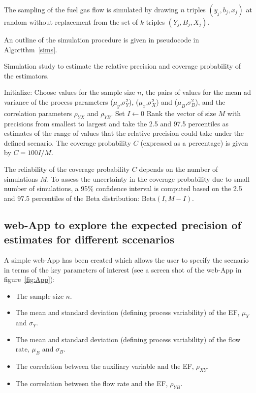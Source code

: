 The sampling of the fuel gas flow is simulated by drawing $n$ triples $(y_j,b_j,x_j)$ at random without replacement from the set of $k$ triples $(Y_j,B_j,X_j)$.

An outline of the simulation procedure is given in pseudocode in Algorithm~\ref{sims}.

\LinesNumbered
\DontPrintSemicolon
{}
\begin{algorithm}[h] \label{sims}
	\caption{Simulation study to estimate the relative precision and coverage probability of the estimators.}
	Initialize: Choose values for the sample size $n$, the pairs of values for the mean ad variance of the process parameters  ($\mu_y$,$\sigma_{Y}^2$), ($\mu_x$,$\sigma_{X}^2$) and ($\mu_B$,$\sigma_{B}^2$), and the correlation parameters $\rho_{YX}$ and $\rho_{YB}$. Set $I \gets 0$\;
	Rank the vector of size $M$ with precisions from smallest to largest and take the 2.5 and 97.5 percentiles as estimates of the range of values that the relative precision could take under the defined scenario. The coverage probability $C$ (expressed as a percentage) is given by $C=100 I/M$.
\end{algorithm}

The reliability of the coverage probability $C$ depends on the number of simulations $M$. To assess the uncertainty in the coverage probability due to small number of simulations, a 95\% confidence interval is computed based on the 2.5 and 97.5 percentiles of the Beta distribution: $\text{Beta}(I,M-I)$. 

\subsection{web-App to explore the expected precision of estimates for different sccenarios}\label{webApp}

A simple web-App has been created which allows the user to specify the scenario in terms of the key parameters of interest (see a screen shot of the web-App in figure~\ref{fig:App}):
\begin{itemize}
	\item The sample size $n$.
	\item The mean and standard deviation (defining process variability) of the EF, $\mu_{Y}$ and $\sigma_Y$.
	\item The mean and standard deviation (defining process variability) of the flow rate, $\mu_{B}$ and $\sigma_B$.
	\item The correlation between the auxiliary variable and the EF, $\rho_{XY}$.
	\item The correlation between the flow rate and the EF, $\rho_{YB}$.
\end{itemize}


